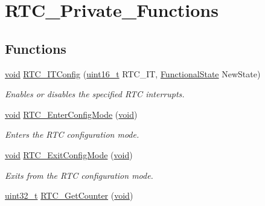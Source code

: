 \hypertarget{group___r_t_c___private___functions}{}\section{R\+T\+C\+\_\+\+Private\+\_\+\+Functions}
\label{group___r_t_c___private___functions}
\subsection*{Functions}
\begin{DoxyCompactItemize}
\item 
\hyperlink{usb__devapi_8h_afabf60e7f57651d6d595a02c75f07cd0}{void} \hyperlink{group___r_t_c___private___functions_ga175dfe88866234730c1ec40d2221c4f4}{R\+T\+C\+\_\+\+I\+T\+Config} (\hyperlink{_p_e___types_8h_a1f1825b69244eb3ad2c7165ddc99c956}{uint16\+\_\+t} R\+T\+C\+\_\+\+IT, \hyperlink{agilefox_2library_2inc_2stm32f10x__type_8h_ac9a7e9a35d2513ec15c3b537aaa4fba1}{Functional\+State} New\+State)
\begin{DoxyCompactList}\small\item\em Enables or disables the specified R\+TC interrupts. \end{DoxyCompactList}\item 
\hyperlink{usb__devapi_8h_afabf60e7f57651d6d595a02c75f07cd0}{void} \hyperlink{group___r_t_c___private___functions_ga23612d9da2fe057a0cd72c684e5b438a}{R\+T\+C\+\_\+\+Enter\+Config\+Mode} (\hyperlink{usb__devapi_8h_afabf60e7f57651d6d595a02c75f07cd0}{void})
\begin{DoxyCompactList}\small\item\em Enters the R\+TC configuration mode. \end{DoxyCompactList}\item 
\hyperlink{usb__devapi_8h_afabf60e7f57651d6d595a02c75f07cd0}{void} \hyperlink{group___r_t_c___private___functions_ga7585aa6e2dbb497173b2fd03bac0d304}{R\+T\+C\+\_\+\+Exit\+Config\+Mode} (\hyperlink{usb__devapi_8h_afabf60e7f57651d6d595a02c75f07cd0}{void})
\begin{DoxyCompactList}\small\item\em Exits from the R\+TC configuration mode. \end{DoxyCompactList}\item 
\hyperlink{_p_e___types_8h_a33594304e786b158f3fb30289278f5af}{uint32\+\_\+t} \hyperlink{group___r_t_c___private___functions_ga6edb19a0ad8414a40610341121c5ea6c}{R\+T\+C\+\_\+\+Get\+Counter} (\hyperlink{usb__devapi_8h_afabf60e7f57651d6d595a02c75f07cd0}{void})

\end{DoxyCompactItemize}
